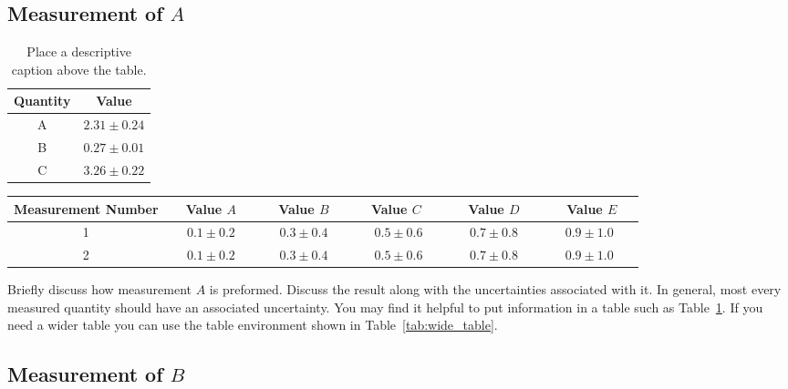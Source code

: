 \documentclass[aps,prd,reprint]{revtex4-1}
\begin{document}
\subsection{\boldmath Measurement of $A$}


\begin{table}
\begin{center}
\caption{\label{tab:example}Place a descriptive caption above the table. }
\begin{tabular}{cc} \hline\hline
Quantity & Value \\ \hline 
A & $2.31\pm0.24$ \\
B & $0.27 \pm 0.01$ \\
C & $3.26 \pm 0.22$  \\ \hline\hline
\end{tabular}
\end{center}
\end{table}

\begin{table*}
\begin{center}
\caption{\label{tab:wide_table}This table is very wide table that will not fit in one column.  Looking at the \LaTeX{} file you will see that I've also added some space between the column headings with the $\sim$ character to make the numbers easier to read.}
\begin{tabular}{cccccc}\hline\hline
Measurement Number & ~~Value $A$~~ & ~~Value $B$~~ & ~~Value $C$ ~~& ~~Value $D$~~ &~~ Value $E$~~ \\ \hline
1 & $0.1 \pm 0.2$ & $0.3 \pm 0.4$ & $0.5 \pm 0.6$ & $0.7\pm 0.8$ & $0.9 \pm 1.0$ \\
2 & $0.1 \pm 0.2$ & $0.3 \pm 0.4$ & $0.5 \pm 0.6$ & $0.7\pm 0.8$ & $0.9 \pm 1.0$ \\ \hline\hline
\end{tabular}
\end{center}
\end{table*}

Briefly discuss how measurement $A$ is preformed.  Discuss the result along with the uncertainties associated with it.  In general, most every measured quantity should have an associated uncertainty.  You may find it helpful to put information in a table such as Table~\ref{tab:example}.  If you need a wider table you can use the table environment shown in Table~\ref{tab:wide_table}.

\subsection{\boldmath Measurement of $B$}
\end{document}

